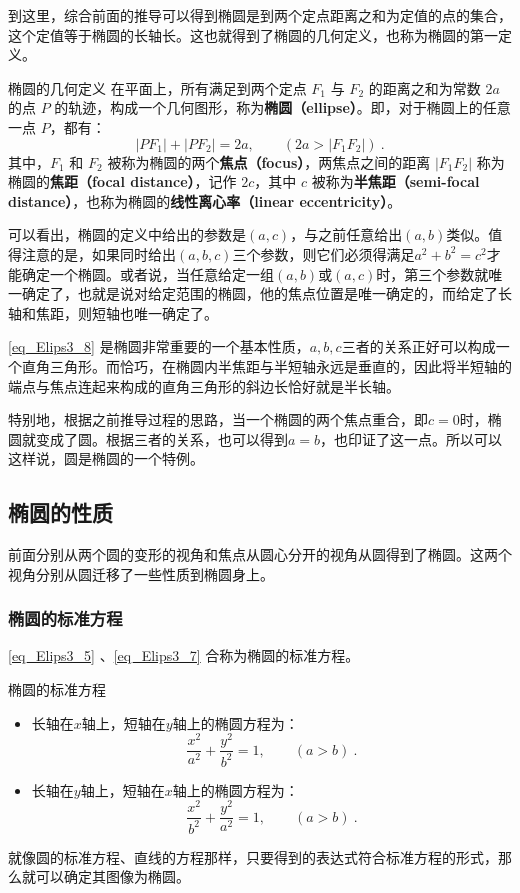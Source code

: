 到这里，综合前面的推导可以得到椭圆是到两个定点距离之和为定值的点的集合，这个定值等于椭圆的长轴长。这也就得到了椭圆的几何定义，也称为椭圆的第一定义。

\begin{definition}{椭圆的几何定义}
在平面上，所有满足到两个定点 $F_1$ 与 $F_2$ 的距离之和为常数 $2a$ 的点 $P$ 的轨迹，构成一个几何图形，称为\textbf{椭圆（ellipse）}。即，对于椭圆上的任意一点 $P$，都有：
\begin{equation}\label{eq_Elips3_9}
|PF_1| + |PF_2| = 2a ,\qquad(2a>|F_1F_2|)~.
\end{equation}
其中，$F_1$ 和 $F_2$ 被称为椭圆的两个\textbf{焦点（focus）}，两焦点之间的距离 $|F_1F_2|$ 称为椭圆的\textbf{焦距（focal distance）}，记作 $2c$，其中 $c$ 被称为\textbf{半焦距（semi-focal distance）}，也称为椭圆的\textbf{线性离心率（linear eccentricity）}。
\end{definition}

可以看出，椭圆的定义中给出的参数是$(a,c)$，与之前任意给出$(a,b)$类似。值得注意的是，如果同时给出$(a,b,c)$三个参数，则它们必须得满足$a^2+b^2=c^2$才能确定一个椭圆。或者说，当任意给定一组$(a,b)$或$(a,c)$时，第三个参数就唯一确定了，也就是说对给定范围的椭圆，他的焦点位置是唯一确定的，而给定了长轴和焦距，则短轴也唯一确定了。

\autoref{eq_Elips3_8} 是椭圆非常重要的一个基本性质，$a,b,c$三者的关系正好可以构成一个直角三角形。而恰巧，在椭圆内半焦距与半短轴永远是垂直的，因此将半短轴的端点与焦点连起来构成的直角三角形的斜边长恰好就是半长轴。

特别地，根据之前推导过程的思路，当一个椭圆的两个焦点重合，即$c=0$时，椭圆就变成了圆。根据三者的关系，也可以得到$a=b$，也印证了这一点。所以可以这样说，圆是椭圆的一个特例。

\subsection{椭圆的性质}

前面分别从两个圆的变形的视角和焦点从圆心分开的视角从圆得到了椭圆。这两个视角分别从圆迁移了一些性质到椭圆身上。

\subsubsection{椭圆的标准方程}

\autoref{eq_Elips3_5} 、\autoref{eq_Elips3_7} 合称为椭圆的标准方程。
\begin{theorem}{椭圆的标准方程}
\begin{itemize}
\item 长轴在$x$轴上，短轴在$y$轴上的椭圆方程为：
\begin{equation}\label{eq_Elips3_3}
\frac{x^2}{a^2} + \frac{y^2}{b^2} = 1,\qquad(a>b)~.
\end{equation}
\item 长轴在$y$轴上，短轴在$x$轴上的椭圆方程为：
\begin{equation}
\frac{x^2}{b^2} + \frac{y^2}{a^2} = 1,\qquad(a>b)~.
\end{equation}
\end{itemize}
\end{theorem}
就像圆的标准方程、直线的方程那样，只要得到的表达式符合标准方程的形式，那么就可以确定其图像为椭圆。

